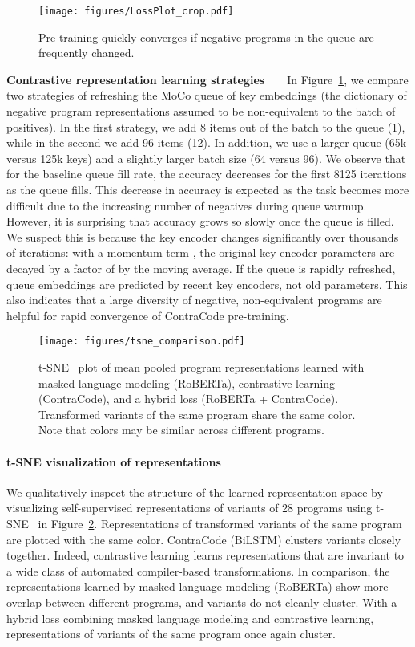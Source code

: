 \documentclass[11pt]{article}
\newcommand{\ours}[0]{ContraCode}
\begin{document}
\begin{figure}[t]
    \centering
    \texttt{[image: figures/LossPlot\_crop.pdf]}
    \caption{Pre-training quickly converges if negative programs in the queue are frequently changed.}
    \label{fig:constrastive_pretraining_accuracy}
\end{figure}
 
\textbf{Contrastive representation learning strategies}~~~~In Figure~\ref{fig:constrastive_pretraining_accuracy}, we compare two strategies of 
refreshing the MoCo queue of key embeddings (the dictionary of negative program representations assumed to be non-equivalent to the batch of positives). 
In the first strategy, we add 8 items out of the batch to the queue (1), while in the second we add 96 items (12). In addition, we use a larger queue (65k versus 125k keys) and a slightly larger batch size (64 versus 96).
We observe that for the baseline queue fill rate, the accuracy decreases for the first 8125 iterations as the queue fills. This decrease in accuracy is expected as the task becomes more difficult due to the increasing number of negatives during queue warmup. However, it is surprising that accuracy grows so slowly once the queue is filled. 
We suspect this is because the key encoder changes significantly over thousands of iterations: with a momentum term , the original key encoder parameters are decayed by a factor of  by the moving average. If the queue is rapidly refreshed, queue embeddings are predicted by recent key encoders, not old parameters. This also indicates that a large diversity of negative, non-equivalent programs are helpful for rapid convergence of \ours{} pre-training.


\begin{figure}
    \centering
    \texttt{[image: figures/tsne\_comparison.pdf]}
    \caption{t-SNE~\citep{tsne2008} plot of mean pooled program representations learned with masked language modeling (RoBERTa), contrastive learning (\ours{}), and a hybrid loss (RoBERTa + \ours{}). Transformed variants of the same program share the same color. Note that colors may be similar across different programs.}\label{fig:tsne}
\end{figure}
 
\paragraph{t-SNE visualization of representations} We qualitatively inspect the structure of the learned representation space by visualizing self-supervised representations of variants of 28 programs using t-SNE~\citep{tsne2008} in Figure~\ref{fig:tsne}. Representations of transformed variants of the same program are plotted with the same color. \ours{} (BiLSTM) clusters variants closely together. Indeed, contrastive learning learns representations that are invariant to a wide class of automated compiler-based transformations. In comparison, the representations learned by masked language modeling (RoBERTa) show more overlap between different programs, and variants do not cleanly cluster. With a hybrid loss combining masked language modeling and contrastive learning, representations of variants of the same program once again cluster.

 
\end{document}

